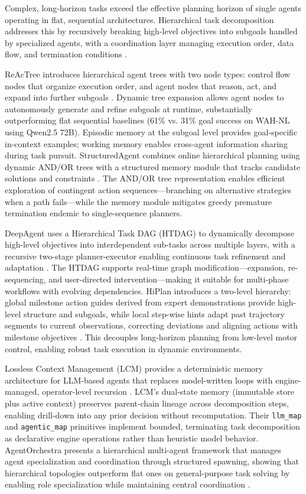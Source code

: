 Complex, long-horizon tasks exceed the effective planning horizon of single agents operating in flat, sequential architectures. Hierarchical task decomposition addresses this by recursively breaking high-level objectives into subgoals handled by specialized agents, with a coordination layer managing execution order, data flow, and termination conditions \cite{lcm2025}.

ReAcTree introduces hierarchical agent trees with two node types: control flow nodes that organize execution order, and agent nodes that reason, act, and expand into further subgoals \cite{reactree2025}. Dynamic tree expansion allows agent nodes to autonomously generate and refine subgoals at runtime, substantially outperforming flat sequential baselines (61\% vs. 31\% goal success on WAH-NL using Qwen2.5 72B). Episodic memory at the subgoal level provides goal-specific in-context examples; working memory enables cross-agent information sharing during task pursuit. StructuredAgent combines online hierarchical planning using dynamic AND/OR trees with a structured memory module that tracks candidate solutions and constraints \cite{structuredagent2025}. The AND/OR tree representation enables efficient exploration of contingent action sequences—branching on alternative strategies when a path fails—while the memory module mitigates greedy premature termination endemic to single-sequence planners.

DeepAgent uses a Hierarchical Task DAG (HTDAG) to dynamically decompose high-level objectives into interdependent sub-tasks across multiple layers, with a recursive two-stage planner-executor enabling continuous task refinement and adaptation \cite{deepagent2025}. The HTDAG supports real-time graph modification—expansion, re-sequencing, and user-directed intervention—making it suitable for multi-phase workflows with evolving dependencies. HiPlan introduces a two-level hierarchy: global milestone action guides derived from expert demonstrations provide high-level structure and subgoals, while local step-wise hints adapt past trajectory segments to current observations, correcting deviations and aligning actions with milestone objectives \cite{hiplan2025}. This decouples long-horizon planning from low-level motor control, enabling robust task execution in dynamic environments.

Lossless Context Management (LCM) provides a deterministic memory architecture for LLM-based agents that replaces model-written loops with engine-managed, operator-level recursion \cite{lcm2025}. LCM's dual-state memory (immutable store plus active context) preserves parent-chain lineage across decomposition steps, enabling drill-down into any prior decision without recomputation. Their \texttt{llm\_map} and \texttt{agentic\_map} primitives implement bounded, terminating task decomposition as declarative engine operations rather than heuristic model behavior. AgentOrchestra presents a hierarchical multi-agent framework that manages agent specialization and coordination through structured spawning, showing that hierarchical topologies outperform flat ones on general-purpose task solving by enabling role specialization while maintaining central coordination \cite{agentorchestra2025}.

